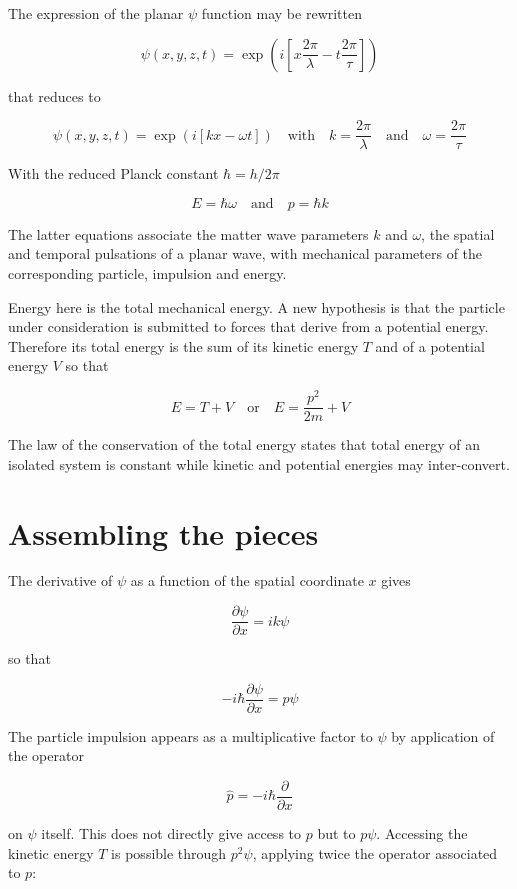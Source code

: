 \documentclass{article}
\begin{document}
The expression of the planar $\psi$ function may be rewritten

\[
\psi(x, y, z, t) = \exp\left(i \left[ x \frac{2\pi}{\lambda} - t \frac{2\pi}{\tau} \right] \right)
\]

\noindent that reduces to

\[
\psi(x, y, z, t) = \exp\left(i \left[ k x - \omega t \right] \right) \quad \mbox{with} \quad k=\frac{2\pi}{\lambda} \quad \mbox{and} \quad \omega=\frac{2\pi}{\tau}
\]

With the reduced Planck constant $\hbar = h/2\pi$

\[
E = \hbar \omega \quad \mbox{and} \quad p = \hbar k
\]

The latter equations associate the matter wave parameters $k$ and $\omega$, the spatial and temporal pulsations of a planar wave,
with mechanical parameters of the corresponding particle, impulsion and energy.

Energy here is the total mechanical energy.
A new hypothesis is that the particle under consideration is submitted to forces
that derive from a potential energy.
Therefore its total energy is the sum of its kinetic energy $T$ and of a potential energy $V$ so that

\[
E = T + V \quad \mbox{or} \quad E = \frac{p^2}{2m} + V
\]

The law of the conservation of the total energy states that total energy of an isolated system is constant while
kinetic and potential energies may inter-convert.

\section{Assembling the pieces}
The derivative of $\psi$ as a function of the spatial coordinate $x$ gives

\[ 
\frac{\partial \psi}{\partial x} = ik\psi
\]

\noindent so that

\[
-i \hbar \frac{\partial \psi}{\partial x} = p \psi
\]

The particle impulsion appears as a multiplicative factor to $\psi$ by application of the operator

\[
\hat{p} = -i \hbar \frac{\partial}{\partial x}
\]

\noindent on $\psi$ itself.
This does not directly give access to $p$ but to $p\psi$.
Accessing the kinetic energy $T$ is possible through $p^2 \psi$, applying twice the operator associated to $p$:
\end{document}
